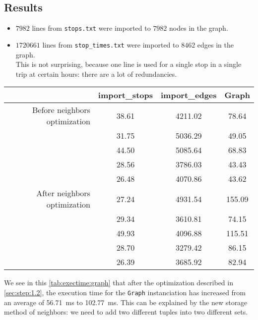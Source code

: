 \documentclass[12pt,english]{article}
\begin{document}
	\subsection{Results}\label{sec:results:1}

	\begin{itemize}
		\item \(7982\) lines from \texttt{stops.txt} were imported to \(7982\) nodes in the graph.
		\item \(1720661\) lines from \texttt{stop\_times.txt} were imported to \(8462\) edges in the graph.\\
		This is not surprising, because one line is used for a single stop in a single trip at certain hours: there are a lot of redundancies.
	\end{itemize}

	\begin{center}
		\begin{tabular}{r c c c}
			& \textbf{\ttfamily import\_stops} & \textbf{\ttfamily import\_edges} & \textbf{\ttfamily Graph}\\
			\hline\hline
			Before neighbors optimization & \num{38.61} & \num{4211.02} & \num{78.64}\\
			& \num{31.75} & \num{5036.29} & \num{49.05}\\
			& \num{44.50} & \num{5085.64} & \num{68.83}\\
			& \num{28.56} & \num{3786.03} & \num{43.43}\\
			& \num{26.48} & \num{4070.86} & \num{43.62}\\
			\hline
			After neighbors optimization & \num{27.24} & \num{4931.54} & \num{155.09}\\
			& \num{29.34} & \num{3610.81} & \num{74.15}\\
			& \num{49.93} & \num{4096.88} & \num{115.51}\\
			& \num{28.70} & \num{3279.42} & \num{86.15}\\
			& \num{26.39} & \num{3685.92} & \num{82.94}\\
		\end{tabular}
		\label{tab:exectime:graph}
	\end{center}
	We see in this \autoref{tab:exectime:graph} that after the optimization described in \autoref{sec:step:1.2}, the execution time for the \texttt{Graph} instanciation has increased from an average of \SI{56.71}{\milli\second} to \SI{102.77}{\milli\second}.
	This can be explained by the new storage method of neighbors: we need to add two different tuples into two different sets.
\end{document}
